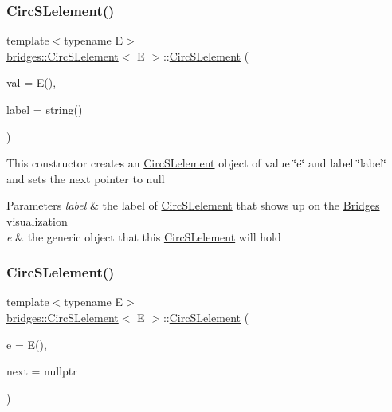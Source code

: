 \subsubsection{\texorpdfstring{Circ\+S\+Lelement()}{CircSLelement()}\hspace{0.1cm}{\footnotesize\ttfamily [2/8]}}
{\footnotesize\ttfamily template$<$typename E$>$ \\
\mbox{\hyperlink{classbridges_1_1_circ_s_lelement}{bridges\+::\+Circ\+S\+Lelement}}$<$ E $>$\+::\mbox{\hyperlink{classbridges_1_1_circ_s_lelement}{Circ\+S\+Lelement}} (\begin{DoxyParamCaption}\item[{E}]{val = {\ttfamily E()},  }\item[{string}]{label = {\ttfamily string()} }\end{DoxyParamCaption})\hspace{0.3cm}{\ttfamily [inline]}}

This constructor creates an \mbox{\hyperlink{classbridges_1_1_circ_s_lelement}{Circ\+S\+Lelement}} object of value \char`\"{}e\char`\"{} and label \char`\"{}label\char`\"{} and sets the next pointer to null


\begin{DoxyParams}{Parameters}
{\em label} & the label of \mbox{\hyperlink{classbridges_1_1_circ_s_lelement}{Circ\+S\+Lelement}} that shows up on the \mbox{\hyperlink{namespacebridges_1_1_bridges}{Bridges}} visualization \\
\hline
{\em e} & the generic object that this \mbox{\hyperlink{classbridges_1_1_circ_s_lelement}{Circ\+S\+Lelement}} will hold \\
\hline
\end{DoxyParams}
\mbox{\label{classbridges_1_1_circ_s_lelement_a0dd7605959b4b52de041e9bcbe5abce7}} 
\subsubsection{\texorpdfstring{Circ\+S\+Lelement()}{CircSLelement()}\hspace{0.1cm}{\footnotesize\ttfamily [3/8]}}
{\footnotesize\ttfamily template$<$typename E$>$ \\
\mbox{\hyperlink{classbridges_1_1_circ_s_lelement}{bridges\+::\+Circ\+S\+Lelement}}$<$ E $>$\+::\mbox{\hyperlink{classbridges_1_1_circ_s_lelement}{Circ\+S\+Lelement}} (\begin{DoxyParamCaption}\item[{E}]{e = {\ttfamily E()},  }\item[{\mbox{\hyperlink{classbridges_1_1_circ_s_lelement}{Circ\+S\+Lelement}}$<$ E $>$ $\ast$}]{next = {\ttfamily nullptr} }\end{DoxyParamCaption})\hspace{0.3cm}{\ttfamily [inline]}}

